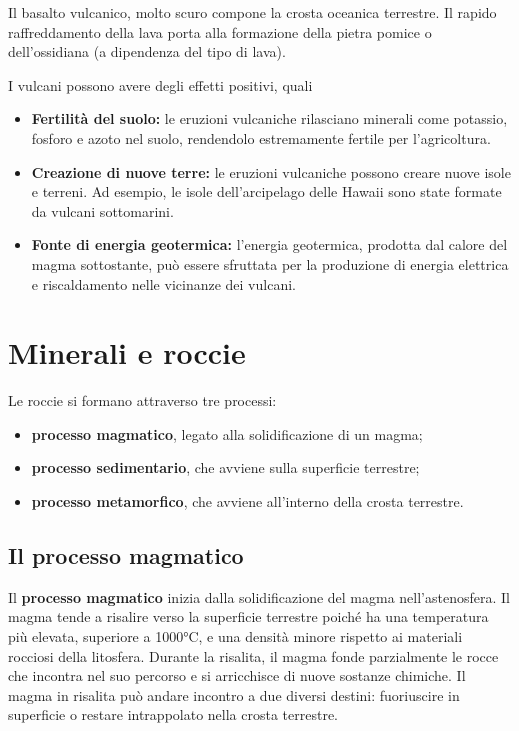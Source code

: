 \documentclass[a4paper]{article}
\begin{document}
Il basalto vulcanico, molto scuro compone la crosta oceanica terrestre.
Il rapido raffreddamento della lava porta alla formazione della pietra pomice o dell'ossidiana
(a dipendenza del tipo di lava).

I vulcani possono avere degli effetti positivi, quali
\begin{itemize}
    \item \textbf{Fertilità del suolo:} le eruzioni vulcaniche rilasciano minerali come potassio,
        fosforo e azoto nel suolo, rendendolo estremamente fertile per l'agricoltura.
    \item \textbf{Creazione di nuove terre:} le eruzioni vulcaniche possono creare nuove isole
        e terreni. Ad esempio, le isole dell'arcipelago delle Hawaii sono state formate
        da vulcani sottomarini.
    \item \textbf{Fonte di energia geotermica:} l'energia geotermica, prodotta dal calore
        del magma sottostante, può essere sfruttata per la produzione
        di energia elettrica e riscaldamento nelle vicinanze dei vulcani.
\end{itemize}

\pagebreak

\section{Minerali e roccie}



Le roccie si formano attraverso tre processi:
\begin{itemize}
    \item \textbf{processo magmatico}, legato alla solidificazione di un magma;
    \item \textbf{processo sedimentario}, che avviene sulla superficie terrestre;
    \item \textbf{processo metamorfico}, che avviene all'interno della crosta terrestre.
\end{itemize}

\subsection{Il processo magmatico}

Il \textbf{processo magmatico} inizia dalla solidificazione del magma
nell'astenosfera.
Il magma tende a risalire verso la superficie terrestre poiché ha una temperatura più elevata,
superiore a 1000°C, e una densità minore rispetto ai materiali rocciosi della litosfera.
Durante la risalita, il magma fonde parzialmente le rocce che incontra nel suo percorso e si
arricchisce di nuove sostanze chimiche.
Il magma in risalita può andare incontro a due diversi destini: fuoriuscire in superficie
o restare intrappolato nella crosta terrestre.
\end{document}
